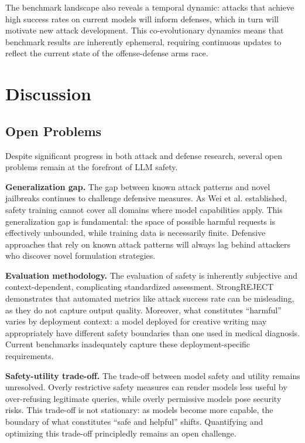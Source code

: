 \documentclass[conference]{IEEEtran}
\begin{document}
The benchmark landscape also reveals a temporal dynamic: attacks that achieve high success rates on current models will inform defenses, which in turn will motivate new attack development. This co-evolutionary dynamics means that benchmark results are inherently ephemeral, requiring continuous updates to reflect the current state of the offense-defense arms race.


\section{Discussion}

\subsection{Open Problems}

Despite significant progress in both attack and defense research, several open problems remain at the forefront of LLM safety.

\textbf{Generalization gap.} The gap between known attack patterns and novel jailbreaks continues to challenge defensive measures. As Wei et al. \cite{wei2023jailbroken} established, safety training cannot cover all domains where model capabilities apply. This generalization gap is fundamental: the space of possible harmful requests is effectively unbounded, while training data is necessarily finite. Defensive approaches that rely on known attack patterns will always lag behind attackers who discover novel formulation strategies.

\textbf{Evaluation methodology.} The evaluation of safety is inherently subjective and context-dependent, complicating standardized assessment. StrongREJECT \cite{souly2024strongreject} demonstrates that automated metrics like attack success rate can be misleading, as they do not capture output quality. Moreover, what constitutes ``harmful'' varies by deployment context: a model deployed for creative writing may appropriately have different safety boundaries than one used in medical diagnosis. Current benchmarks inadequately capture these deployment-specific requirements.

\textbf{Safety-utility trade-off.} The trade-off between model safety and utility remains unresolved. Overly restrictive safety measures can render models less useful by over-refusing legitimate queries, while overly permissive models pose security risks. This trade-off is not stationary: as models become more capable, the boundary of what constitutes ``safe and helpful'' shifts. Quantifying and optimizing this trade-off principledly remains an open challenge.
\end{document}
